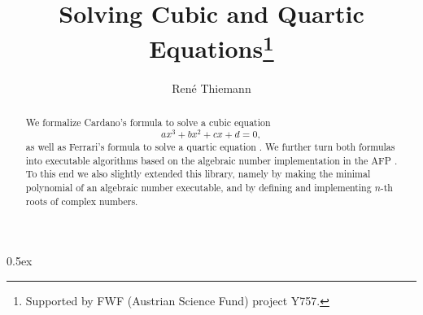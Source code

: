 \documentclass[11pt,a4paper]{article}
\begin{document}
\title{Solving Cubic and Quartic Equations\footnote{Supported by FWF (Austrian Science Fund) project Y757.}}
\author{Ren\'e Thiemann}
\maketitle

\begin{abstract}
We formalize Cardano's formula to solve a cubic equation 
\[
ax^3 + bx^2 + cx + d = 0,
\]
as well as Ferrari's formula to solve a quartic equation \cite{AM}. 
We further turn both formulas into executable algorithms 
based on the algebraic number implementation in the AFP \cite{Algebraic_Numbers-AFP}. 
To this end we also slightly extended this library, namely by making
the minimal polynomial of an algebraic number executable, and by defining and
implementing $n$-th roots of complex numbers.
\end{abstract}

\tableofcontents

\parindent 0pt\parskip 0.5ex





\end{document}
